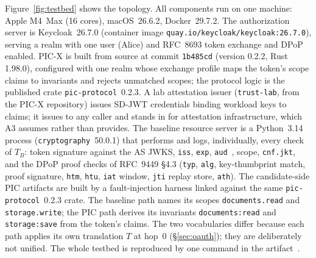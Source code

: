 \documentclass[conference]{IEEEtran}
\begin{document}
Figure~\ref{fig:testbed} shows the topology. All components run on one machine: Apple M4~Max (16 cores), macOS~26.6.2, Docker~29.7.2. The authorization server is Keycloak~26.7.0 (container image \texttt{quay.io/keycloak/keycloak:26.7.0}), serving a realm with one user (Alice) and RFC~8693 token exchange and DPoP enabled. PIC-X is built from source at commit \texttt{1b485cd} (version 0.2.2, Rust 1.98.0), configured with one realm whose exchange profile maps the token's scope claims to invariants and rejects unmatched scopes; the protocol logic is the published crate \texttt{pic-protocol}~0.2.3. A lab attestation issuer (\texttt{trust-lab}, from the PIC-X repository) issues SD-JWT credentials binding workload keys to claims; it issues to any caller and stands in for attestation infrastructure, which A3 assumes rather than provides. The baseline resource server is a Python~3.14 process (\texttt{cryptography}~50.0.1) that performs and logs, individually, every check of $T_B$: token signature against the AS JWKS, \texttt{iss}, \texttt{exp}, \texttt{aud}~\cite{rfc8707}, scope, \texttt{cnf.jkt}, and the DPoP proof checks of RFC~9449 \S4.3 (\texttt{typ}, \texttt{alg}, key-thumbprint match, proof signature, \texttt{htm}, \texttt{htu}, \texttt{iat} window, \texttt{jti} replay store, \texttt{ath}). The candidate-side PIC artifacts are built by a fault-injection harness linked against the same \texttt{pic-protocol}~0.2.3 crate. The baseline path names its scopes \texttt{documents.read} and \texttt{storage.write}; the PIC path derives its invariants \texttt{documents:read} and \texttt{storage:save} from the token's claims. The two vocabularies differ because each path applies its own translation $T$ at hop~0 (\S\ref{sec:oauth}); they are deliberately not unified. The whole testbed is reproduced by one command in the artifact~\cite{picartifact}.
\end{document}
